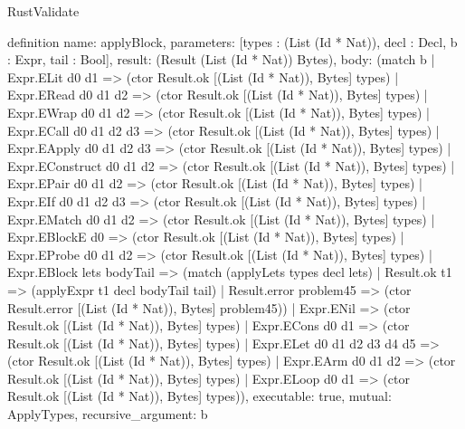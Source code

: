 \begin{lexlean}{RustValidate}
\begin{semanticmodule}
definition{
  name: applyBlock,
  parameters: [types : (List (Id * Nat)), decl : Decl, b : Expr, tail : Bool],
  result: (Result (List (Id * Nat)) Bytes),
  body: (match b
    | Expr.ELit d0 d1 => (ctor Result.ok [(List (Id * Nat)), Bytes] types)
    | Expr.ERead d0 d1 d2 => (ctor Result.ok [(List (Id * Nat)), Bytes] types)
    | Expr.EWrap d0 d1 d2 => (ctor Result.ok [(List (Id * Nat)), Bytes] types)
    | Expr.ECall d0 d1 d2 d3 => (ctor Result.ok [(List (Id * Nat)), Bytes] types)
    | Expr.EApply d0 d1 d2 d3 => (ctor Result.ok [(List (Id * Nat)), Bytes] types)
    | Expr.EConstruct d0 d1 d2 => (ctor Result.ok [(List (Id * Nat)), Bytes] types)
    | Expr.EPair d0 d1 d2 => (ctor Result.ok [(List (Id * Nat)), Bytes] types)
    | Expr.EIf d0 d1 d2 d3 => (ctor Result.ok [(List (Id * Nat)), Bytes] types)
    | Expr.EMatch d0 d1 d2 => (ctor Result.ok [(List (Id * Nat)), Bytes] types)
    | Expr.EBlockE d0 => (ctor Result.ok [(List (Id * Nat)), Bytes] types)
    | Expr.EProbe d0 d1 d2 => (ctor Result.ok [(List (Id * Nat)), Bytes] types)
    | Expr.EBlock lets bodyTail => (match (applyLets types decl lets)
      | Result.ok t1 => (applyExpr t1 decl bodyTail tail)
      | Result.error problem45 => (ctor Result.error [(List (Id * Nat)), Bytes] problem45))
    | Expr.ENil => (ctor Result.ok [(List (Id * Nat)), Bytes] types)
    | Expr.ECons d0 d1 => (ctor Result.ok [(List (Id * Nat)), Bytes] types)
    | Expr.ELet d0 d1 d2 d3 d4 d5 => (ctor Result.ok [(List (Id * Nat)), Bytes] types)
    | Expr.EArm d0 d1 d2 => (ctor Result.ok [(List (Id * Nat)), Bytes] types)
    | Expr.ELoop d0 d1 => (ctor Result.ok [(List (Id * Nat)), Bytes] types)),
  executable: true,
  mutual: ApplyTypes,
  recursive_argument: b
}


\end{semanticmodule}
\end{lexlean}
